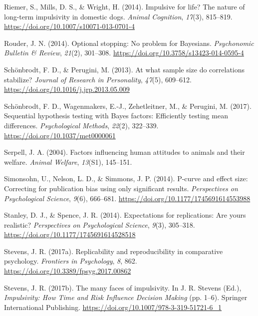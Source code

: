 \documentclass[
  pub,floatsintext]{apa6}
\newlength{\cslhangindent}
\newlength{\cslentryspacingunit} %
\newenvironment{CSLReferences}[2] %
 {%
  \setlength{\parindent}{0pt}
  \ifodd #1
  \let\oldpar\par
  \def\par{\hangindent=\cslhangindent\oldpar}
  \fi
  \setlength{\parskip}{#2\cslentryspacingunit}
 }%
 {}
\begin{document}
\begin{CSLReferences}{1}{0}
\leavevmode{}%
Riemer, S., Mills, D. S., \& Wright, H. (2014). Impulsive for life? {The} nature of long-term impulsivity in domestic dogs. \emph{Animal Cognition}, \emph{17}(3), 815--819. \url{https://doi.org/10.1007/s10071-013-0701-4}

\leavevmode{}%
Rouder, J. N. (2014). Optional stopping: {No} problem for {Bayesians}. \emph{Psychonomic Bulletin \& Review}, \emph{21}(2), 301--308. \url{https://doi.org/10.3758/s13423-014-0595-4}

\leavevmode{}%
Schönbrodt, F. D., \& Perugini, M. (2013). At what sample size do correlations stabilize? \emph{Journal of Research in Personality}, \emph{47}(5), 609--612. \url{https://doi.org/10.1016/j.jrp.2013.05.009}

\leavevmode{}%
Schönbrodt, F. D., Wagenmakers, E.-J., Zehetleitner, M., \& Perugini, M. (2017). Sequential hypothesis testing with {Bayes} factors: {Efficiently} testing mean differences. \emph{Psychological Methods}, \emph{22}(2), 322--339. \url{https://doi.org/10.1037/met0000061}

\leavevmode{}%
Serpell, J. A. (2004). Factors influencing human attitudes to animals and their welfare. \emph{Animal Welfare}, \emph{13}(S1), 145--151.

\leavevmode{}%
Simonsohn, U., Nelson, L. D., \& Simmons, J. P. (2014). P-curve and effect size: {Correcting} for publication bias using only significant results. \emph{Perspectives on Psychological Science}, \emph{9}(6), 666--681. \url{https://doi.org/10.1177/1745691614553988}

\leavevmode{}%
Stanley, D. J., \& Spence, J. R. (2014). Expectations for replications: {Are} yours realistic? \emph{Perspectives on Psychological Science}, \emph{9}(3), 305--318. \url{https://doi.org/10.1177/1745691614528518}

\leavevmode{}%
Stevens, J. R. (2017a). Replicability and reproducibility in comparative psychology. \emph{Frontiers in Psychology}, \emph{8}, 862. \url{https://doi.org/10.3389/fpsyg.2017.00862}

\leavevmode{}%
Stevens, J. R. (2017b). The many faces of impulsivity. In J. R. Stevens (Ed.), \emph{Impulsivity: {How Time} and {Risk Influence Decision Making}} (pp. 1--6). {Springer International Publishing}. \url{https://doi.org/10.1007/978-3-319-51721-6_1}


\end{CSLReferences}
\end{document}
